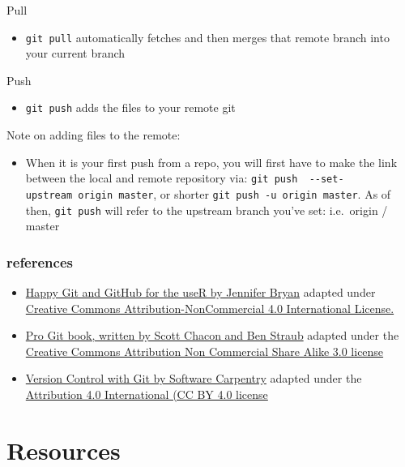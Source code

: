 \documentclass[
  12pt,
]{book}
\providecommand{\tightlist}{%
  \setlength{\itemsep}{0pt}\setlength{\parskip}{0pt}}
\begin{document}
Pull

\begin{itemize}
\tightlist
\item
  \texttt{git\ pull} automatically fetches and then merges that remote branch into your current branch
\end{itemize}

Push

\begin{itemize}
\tightlist
\item
  \texttt{git\ push} adds the files to your remote git
\end{itemize}

Note on adding files to the remote:

\begin{itemize}
\tightlist
\item
  When it is your first push from a repo, you will first have to make the link between the local and remote repository via: \texttt{git\ push\ \ -\/-set-upstream\ origin\ master}, or shorter \texttt{git\ push\ -u\ origin\ master}. As of then, \texttt{git\ push} will refer to the upstream branch you've set: i.e.~origin / master
\end{itemize}

\hypertarget{references}{%
\subsection{references}\label{references}}

\begin{itemize}
\tightlist
\item
  \href{http://happygitwithr.com/rmd-test-drive.html}{Happy Git and GitHub for the useR by Jennifer Bryan} adapted under \href{https://creativecommons.org/licenses/by/4.0/}{Creative Commons Attribution-NonCommercial 4.0 International License.}
\item
  \href{https://git-scm.com/book/en/v2}{Pro Git book, written by Scott Chacon and Ben Straub} adapted under the \href{https://creativecommons.org/licenses/by/3.0/}{Creative Commons Attribution Non Commercial Share Alike 3.0 license}
\item
  \href{http://swcarpentry.github.io/git-novice/}{Version Control with Git by Software Carpentry} adapted under the \href{https://creativecommons.org/licenses/by/4.0/}{Attribution 4.0 International (CC BY 4.0 license}
\end{itemize}

\hypertarget{resources}{%
\chapter{Resources}\label{resources}}
\end{document}
